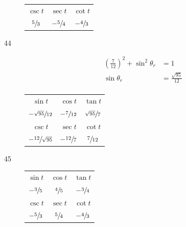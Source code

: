 \documentclass{exam}
\begin{document}
\begin{description}
\begin{tabular}[H]{ccc}
          \midrule

          $\csc t$       & $\sec t$         & $\cot t$ \\
          $\sfrac{5}{3}$ & $- \sfrac{5}{4}$ & $- \sfrac{4}{3}$ \\

          \bottomrule
        \end{tabular}

      \pagebreak

      \item[44]
        \begin{align*}
          \left( \frac{7}{12} \right)^2 + \sin^2 \theta_r & = 1 \\
          \sin \theta_r                                   & = \frac{\sqrt{95}}{12} \\
        \end{align*}

        \begin{tabular}[H]{ccc}
          \toprule

          $\sin t$                 & $\cos t$         & $\tan t$              \\
          $-\sfrac{\sqrt{95}}{12}$ & $-\sfrac{7}{12}$ & $\sfrac{\sqrt{95}}{7}$ \\

          \midrule

          $\csc t$                 & $\sec t$         & $\cot t$ \\
          $-\sfrac{12}{\sqrt{95}}$ & $-\sfrac{12}{7}$ & $\sfrac{7}{12}$ \\

          \bottomrule
        \end{tabular}

      \item[45]
        \begin{tabular}[H]{ccc}
          \toprule
          $\sin t$        & $\cos t$       & $\tan t$       \\
          $-\sfrac{3}{5}$ & $\sfrac{4}{5}$ & $-\sfrac{3}{4}$ \\

          \midrule

          $\csc t$        & $\sec t$       & $\cot t$ \\
          $-\sfrac{5}{3}$ & $\sfrac{5}{4}$ & $-\sfrac{4}{3}$ \\

          \bottomrule
        \end{tabular}


\end{description}
\end{document}
